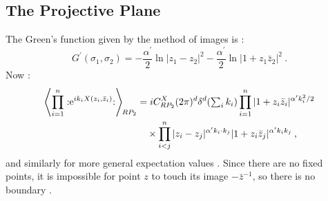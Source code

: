 \subsection*{The Projective Plane}
The Green's function given by the method of images is :
\begin{equation}
	G^{\prime}(\sigma_{1}, \sigma_{2})=-\frac{\alpha^{\prime}}{2} \ln |z_{1}-z_{2}|^{2}
	-\frac{\alpha^{\prime}}{2} \ln |1+z_{1} \bar{z}_{2}|^{2} \:. \label{6.2.38}
\end{equation}
Now :
\begin{align}
	\left\langle\prod_{i=1}^{n}:\mathrel{\mathrm{e}^{i k_{i} X(z_{i}, \bar{z}_{i})}}:\right\rangle\bigg._{\!\! RP_{2}} 
	&=i C_{RP_{2}}^{X}(2 \pi)^{d} \delta^{d}({\textstyle\sum_{i} k_{i}}) 
	\prod_{i=1}^{n}|1+z_{i} \bar{z}_{i}|^{\alpha^{\prime} k_{i}^{2} / 2} \nonumber \\
	&\quad  \times \prod_{i<j}^{n}|z_{i}-z_{j}|^{\alpha^{\prime} k_{i} \cdot k_{j}}|1+z_{i} \bar{z}_{j}|^{\alpha^{\prime} k_{i} k_{j}} \:, \label{6.2.39}
\end{align}
and similarly for more general expectation values . Since there are no fixed points, it is impossible for point $z$ to touch its image $-\bar{z}^{-1}$, so there is no boundary .
